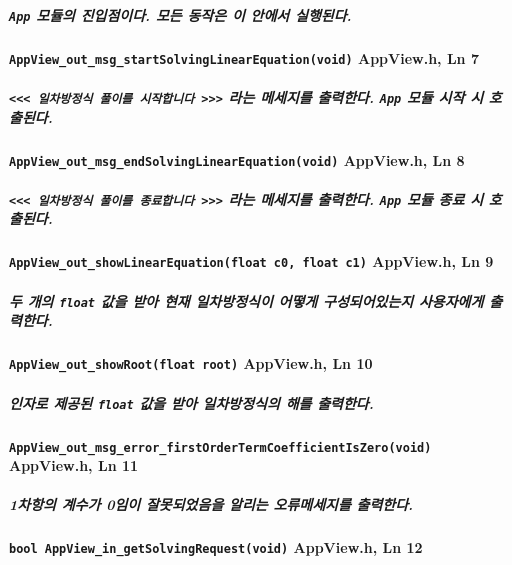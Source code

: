 \documentclass{article}
\begin{document}
    \subparagraph{\normalfont\texttt{App} 모듈의 진입점이다. 모든 동작은 이 안에서 실행된다.}
    
    \paragraph{\large\texttt{AppView\_out\_msg\_startSolvingLinearEquation(void)} \tiny AppView.h, Ln 7}

    \subparagraph{\normalfont\texttt{<<< 일차방정식 풀이를 시작합니다 >>>} 라는 메세지를 출력한다. \texttt{App} 모듈 시작 시 호출된다.}

    \paragraph{\large\texttt{AppView\_out\_msg\_endSolvingLinearEquation(void)} \tiny AppView.h, Ln 8}

    \subparagraph{\normalfont\texttt{<<< 일차방정식 풀이를 종료합니다 >>>} 라는 메세지를 출력한다. \texttt{App} 모듈 종료 시 호출된다.}

    \paragraph{\large\texttt{AppView\_out\_showLinearEquation(float c0, float c1)} \tiny AppView.h, Ln 9}
    
    \subparagraph{\normalfont 두 개의 \texttt{float} 값을 받아 현재 일차방정식이 어떻게 구성되어있는지 사용자에게 출력한다.}

    \paragraph{\large\texttt{AppView\_out\_showRoot(float root)} \tiny AppView.h, Ln 10}

    \subparagraph{\normalfont 인자로 제공된 \texttt{float} 값을 받아 일차방정식의 해를 출력한다.}

    \paragraph{\large\texttt{AppView\_out\_msg\_error\_firstOrderTermCoefficientIsZero(void)} \tiny AppView.h, Ln 11}

    \subparagraph{\normalfont 1차항의 계수가 0임이 잘못되었음을 알리는 오류메세지를 출력한다.}

    \paragraph{\large\texttt{bool AppView\_in\_getSolvingRequest(void)} \tiny AppView.h, Ln 12}
\end{document}
